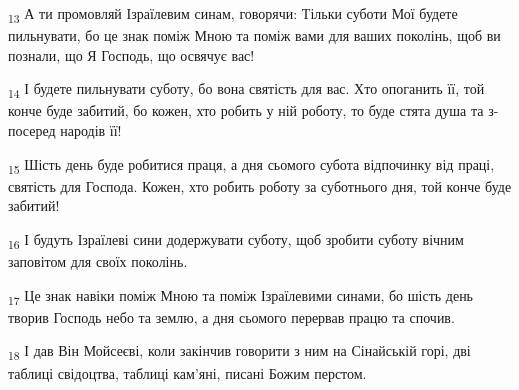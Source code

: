\begin{tcolorbox}
\textsubscript{13} А ти промовляй Ізраїлевим синам, говорячи: Тільки суботи Мої будете пильнувати, бо це знак поміж Мною та поміж вами для ваших поколінь, щоб ви познали, що Я Господь, що освячує вас!
\end{tcolorbox}
\begin{tcolorbox}
\textsubscript{14} І будете пильнувати суботу, бо вона святість для вас. Хто опоганить її, той конче буде забитий, бо кожен, хто робить у ній роботу, то буде стята душа та з-посеред народів її!
\end{tcolorbox}
\begin{tcolorbox}
\textsubscript{15} Шість день буде робитися праця, а дня сьомого субота відпочинку від праці, святість для Господа. Кожен, хто робить роботу за суботнього дня, той конче буде забитий!
\end{tcolorbox}
\begin{tcolorbox}
\textsubscript{16} І будуть Ізраїлеві сини додержувати суботу, щоб зробити суботу вічним заповітом для своїх поколінь.
\end{tcolorbox}
\begin{tcolorbox}
\textsubscript{17} Це знак навіки поміж Мною та поміж Ізраїлевими синами, бо шість день творив Господь небо та землю, а дня сьомого перервав працю та спочив.
\end{tcolorbox}
\begin{tcolorbox}
\textsubscript{18} І дав Він Мойсеєві, коли закінчив говорити з ним на Сінайській горі, дві таблиці свідоцтва, таблиці кам'яні, писані Божим перстом.
\end{tcolorbox}
